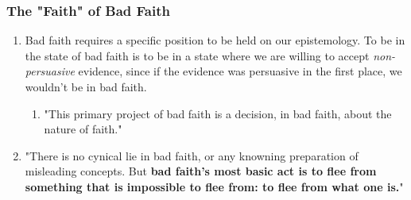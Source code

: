 \subsubsection{The "Faith" of Bad Faith}

\begin{enumerate}
  \item Bad faith requires a specific position to be held on our epistemology. To be in the state of bad faith is to be in a state where we are willing to accept \emph{non-persuasive} evidence, since if the evidence was persuasive in the first place, we wouldn't be in bad faith.
  \begin{enumerate}
    \item "This primary project of bad faith is a decision, in bad faith, about the nature of faith." \autocite[114]{sartre}
  \end{enumerate}
  \item "There is no cynical lie in bad faith, or any knowning preparation of misleading concepts. But \textbf{bad faith's most basic act is to flee from something that is impossible to flee from: to flee from what one is.}" \autocite[117]{sartre}
\end{enumerate}
